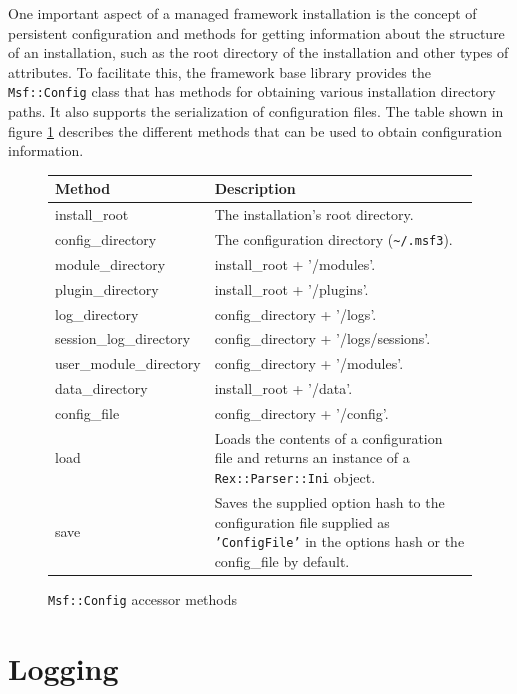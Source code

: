 \documentclass{report}
\begin{document}
\par
One important aspect of a managed framework installation is the
concept of persistent configuration and methods for getting
information about the structure of an installation, such as the root
directory of the installation and other types of attributes.  To
facilitate this, the framework base library provides the
\texttt{Msf::Config} class that has methods for obtaining various
installation directory paths.  It also supports the serialization of
configuration files.  The table shown in figure
\ref{fig-table-config} describes the different methods that can be
used to obtain configuration information.


\begin{figure}[h]
\begin{center}
\begin{tabular}{|l|p{3.5in}|}
\hline
\textbf{Method} & \textbf{Description} \\
\hline
install\_root & The installation's root directory. \\
\hline
config\_directory & The configuration directory (\verb#~/.msf3#). \\
\hline
module\_directory & install\_root + '/modules'. \\
\hline
plugin\_directory & install\_root + '/plugins'. \\
\hline
log\_directory & config\_directory + '/logs'. \\
\hline
session\_log\_directory & config\_directory + '/logs/sessions'. \\
\hline
user\_module\_directory & config\_directory + '/modules'. \\
\hline
data\_directory & install\_root + '/data'. \\
\hline
config\_file & config\_directory + '/config'. \\
\hline
load & Loads the contents of a configuration file and returns an instance of a \texttt{Rex::Parser::Ini} object. \\
\hline
save & Saves the supplied option hash to the configuration file supplied as \texttt{'ConfigFile'} in the options hash or the config\_file by default. \\
\hline
\end{tabular}
\caption{\texttt{Msf::Config} accessor methods}
\label{fig-table-config}
\end{center}
\end{figure}

    \section{Logging}
\end{document}
